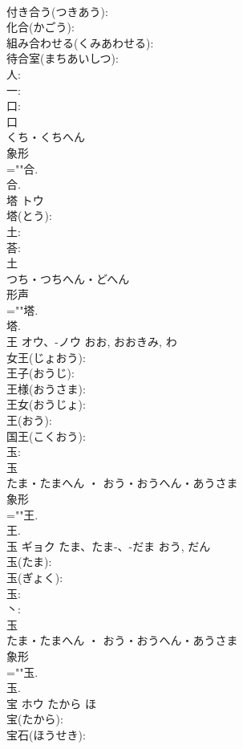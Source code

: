 \documentclass[8pt]{extreport}
\begin{document}
\begin{CJK}{UTF8}{min}
\\	付き合う(つきあう): 
\\	化合(かごう): 
\\	組み合わせる(くみあわせる): 
\\	待合室(まちあいしつ): 
\\	人: 
\\	一: 
\\	口: 
\\	口	
\\	くち・くちへん	
\\	象形 
\\	=""合.
\\	合.
\\	塔	トウ			
\\	塔(とう): 
\\	土: 
\\	荅: 
\\	土	
\\	つち・つちへん・どへん	
\\	形声 
\\	=""塔.
\\	塔.
\\	王	オウ、-ノウ		おお, おおきみ, わ	
\\	女王(じょおう): 
\\	王子(おうじ): 
\\	王様(おうさま): 
\\	王女(おうじょ): 
\\	王(おう): 
\\	国王(こくおう): 
\\	玉: 
\\	玉	
\\	たま・たまへん ・ おう・おうへん・あうさま	
\\	象形 
\\	=""王.
\\	王.
\\	玉	ギョク	たま、たま-、-だま	おう, だん	
\\	玉(たま): 
\\	玉(ぎょく): 
\\	玉: 
\\	丶: 
\\	玉	
\\	たま・たまへん ・ おう・おうへん・あうさま	
\\	象形 
\\	=""玉.
\\	玉.
\\	宝	ホウ	たから	ほ	
\\	宝(たから): 
\\	宝石(ほうせき): 

\end{CJK}
\end{document}
